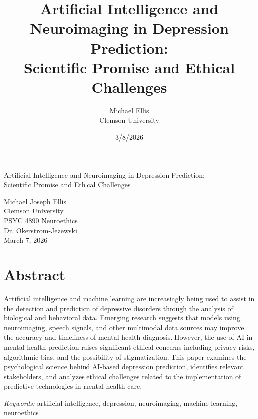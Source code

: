 \documentclass[12pt]{article}
\title{Artificial Intelligence and Neuroimaging in Depression Prediction:\\
Scientific Promise and Ethical Challenges}
\author{Michael Ellis \\
Clemson University}
\date{3/8/2026}
\begin{document}
\pagestyle{fancy}
\fancyhf{}
\fancyhead[R]{\thepage}
\renewcommand{\headrulewidth}{0pt}

\begin{titlepage}
\centering

\vspace*{2in}

{\Large Artificial Intelligence and Neuroimaging in Depression Prediction:\\
Scientific Promise and Ethical Challenges}

\vspace{1.5in}

Michael Joseph Ellis \\

Clemson University \\

PSYC 4890 Neuroethics \\

Dr. Okerstrom-Jezewski \\

March 7, 2026

\vfill

\end{titlepage}

\newpage
\section*{Abstract}

\noindent Artificial intelligence and machine learning are increasingly being used to assist in the detection and prediction of depressive disorders through the analysis of biological and behavioral data. Emerging research suggests that models using neuroimaging, speech signals, and other multimodal data sources may improve the accuracy and timeliness of mental health diagnosis. However, the use of AI in mental health prediction raises significant ethical concerns including privacy risks, algorithmic bias, and the possibility of stigmatization. This paper examines the psychological science behind AI-based depression prediction, identifies relevant stakeholders, and analyzes ethical challenges related to the implementation of predictive technologies in mental health care.

\vspace{0.5cm}

\textit{Keywords:} artificial intelligence, depression, neuroimaging, machine learning, neuroethics
\end{document}
